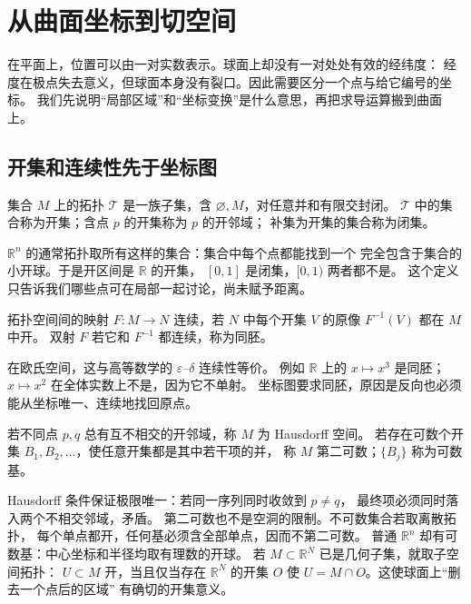 \chapter{从曲面坐标到切空间}
\label{chap:math-manifolds}

在平面上，位置可以由一对实数表示。球面上却没有一对处处有效的经纬度：
经度在极点失去意义，但球面本身没有裂口。因此需要区分一个点与给它编号的坐标。
我们先说明“局部区域”和“坐标变换”是什么意思，再把求导运算搬到曲面上。

\section{开集和连续性先于坐标图}
\label{sec:math-manifold-topology}

\begin{definition}[拓扑、邻域与闭集]
集合 \(M\) 上的拓扑 \(\mathcal T\) 是一族子集，含
\(\varnothing,M\)，对任意并和有限交封闭。
\(\mathcal T\) 中的集合称为开集；含点 \(p\) 的开集称为 \(p\) 的开邻域；
补集为开集的集合称为闭集。
\end{definition}

\(\mathbb R^n\) 的通常拓扑取所有这样的集合：集合中每个点都能找到一个
完全包含于集合的小开球。于是开区间是 \(\mathbb R\) 的开集，
\([0,1]\) 是闭集，\([0,1)\) 两者都不是。
这个定义只告诉我们哪些点可在局部一起讨论，尚未赋予距离。

\begin{definition}[连续映射与同胚]
拓扑空间间的映射 \(F:M\to N\) 连续，若 \(N\) 中每个开集 \(V\)
的原像 \(F^{-1}(V)\) 都在 \(M\) 中开。
双射 \(F\) 若它和 \(F^{-1}\) 都连续，称为同胚。
\end{definition}

在欧氏空间，这与高等数学的 \(\varepsilon\)–\(\delta\) 连续性等价。
例如 \(\mathbb R\) 上的 \(x\mapsto x^3\) 是同胚；
\(x\mapsto x^2\) 在全体实数上不是，因为它不单射。
坐标图要求同胚，原因是反向也必须能从坐标唯一、连续地找回原点。

\begin{definition}[两个分离性条件]
若不同点 \(p,q\) 总有互不相交的开邻域，称 \(M\) 为 Hausdorff 空间。
若存在可数个开集 \(B_1,B_2,\ldots\)，使任意开集都是其中若干项的并，
称 \(M\) 第二可数；\(\{B_j\}\) 称为可数基。
\end{definition}

Hausdorff 条件保证极限唯一：若同一序列同时收敛到 \(p\ne q\)，
最终项必须同时落入两个不相交邻域，矛盾。
第二可数也不是空洞的限制。不可数集合若取离散拓扑，
每个单点都开，任何基必须含全部单点，因而不第二可数。
普通 \(\mathbb R^n\) 却有可数基：中心坐标和半径均取有理数的开球。
若 \(M\subset\mathbb R^N\) 已是几何子集，就取子空间拓扑：
\(U\subset M\) 开，当且仅当存在 \(\mathbb R^N\) 的开集 \(O\)
使 \(U=M\cap O\)。这使球面上“删去一个点后的区域”
有确切的开集意义。

